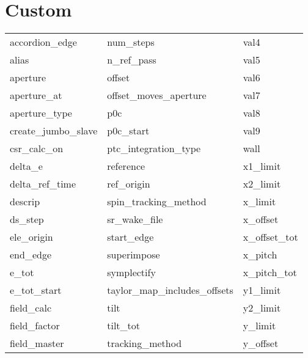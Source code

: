  \section{Custom}
 \label{s:list.custom}
 
 \begin{tabular}{lll} \toprule
accordion_edge              & num_steps                   & val4                        \\
alias                       & n_ref_pass                  & val5                        \\
aperture                    & offset                      & val6                        \\
aperture_at                 & offset_moves_aperture       & val7                        \\
aperture_type               & p0c                         & val8                        \\
create_jumbo_slave          & p0c_start                   & val9                        \\
csr_calc_on                 & ptc_integration_type        & wall                        \\
delta_e                     & reference                   & x1_limit                    \\
delta_ref_time              & ref_origin                  & x2_limit                    \\
descrip                     & spin_tracking_method        & x_limit                     \\
ds_step                     & sr_wake_file                & x_offset                    \\
ele_origin                  & start_edge                  & x_offset_tot                \\
end_edge                    & superimpose                 & x_pitch                     \\
e_tot                       & symplectify                 & x_pitch_tot                 \\
e_tot_start                 & taylor_map_includes_offsets & y1_limit                    \\
field_calc                  & tilt                        & y2_limit                    \\
field_factor                & tilt_tot                    & y_limit                     \\
field_master                & tracking_method             & y_offset                    \\

\end{tabular}
